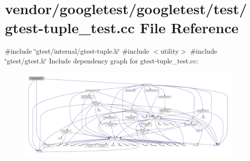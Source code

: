\hypertarget{gtest-tuple__test_8cc}{}\section{vendor/googletest/googletest/test/gtest-\/tuple\+\_\+test.cc File Reference}
\label{gtest-tuple__test_8cc}
{\ttfamily \#include \char`\"{}gtest/internal/gtest-\/tuple.\+h\char`\"{}}\newline
{\ttfamily \#include $<$utility$>$}\newline
{\ttfamily \#include \char`\"{}gtest/gtest.\+h\char`\"{}}\newline
Include dependency graph for gtest-\/tuple\+\_\+test.cc\+:
\nopagebreak
\begin{figure}[H]
\begin{center}
\leavevmode
\includegraphics[width=350pt]{gtest-tuple__test_8cc__incl}
\end{center}
\end{figure}
